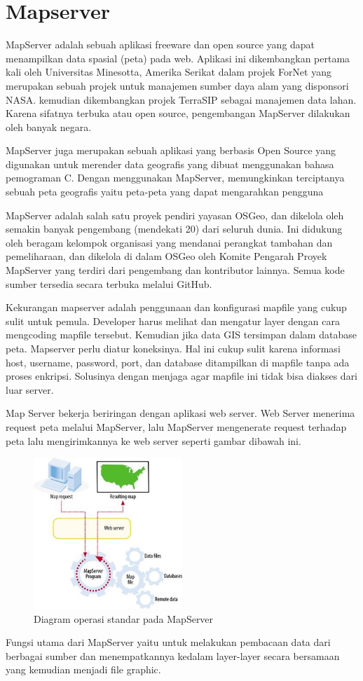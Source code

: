 \section{Mapserver}
MapServer adalah sebuah aplikasi freeware dan open source yang dapat menampilkan data spasial (peta) pada web. Aplikasi ini dikembangkan pertama kali oleh Universitas Minesotta, Amerika Serikat dalam projek ForNet yang merupakan sebuah projek untuk manajemen sumber daya alam yang disponsori NASA. kemudian dikembangkan projek TerraSIP sebagai manajemen data lahan. Karena sifatnya terbuka atau open source, pengembangan MapServer dilakukan oleh banyak negara.

 MapServer juga merupakan sebuah aplikasi yang berbasis Open Source yang digunakan untuk merender data geografis yang dibuat menggunakan bahasa pemograman C. Dengan menggunakan MapServer, memungkinkan terciptanya sebuah peta geografis yaitu peta-peta yang dapat mengarahkan pengguna

MapServer adalah salah satu proyek pendiri yayasan OSGeo, dan dikelola oleh semakin banyak pengembang (mendekati 20) dari seluruh dunia. Ini didukung oleh beragam kelompok organisasi yang mendanai perangkat tambahan dan pemeliharaan, dan dikelola di dalam OSGeo oleh Komite Pengarah Proyek MapServer yang terdiri dari pengembang dan kontributor lainnya. Semua kode sumber tersedia secara terbuka melalui GitHub.

Kekurangan mapserver adalah penggunaan dan konfigurasi mapfile yang cukup sulit untuk pemula. Developer harus melihat dan mengatur layer dengan cara mengcoding mapfile tersebut. Kemudian jika data GIS tersimpan dalam database peta. Mapserver perlu diatur koneksinya. Hal ini cukup sulit karena informasi host, username, password, port, dan database ditampilkan di mapfile tanpa ada proses enkripsi. Solusinya dengan menjaga agar mapfile ini tidak bisa diakses dari luar server.

Map Server bekerja beriringan dengan aplikasi web server. Web Server menerima request peta melalui MapServer, lalu MapServer mengenerate request terhadap peta lalu mengirimkannya ke web server seperti gambar dibawah ini.
\begin{figure}[ht]
	    \centerline{\includegraphics[width=0.50\textwidth]{figures/gambar5.JPG}}
	    \caption{Diagram operasi standar pada MapServer}
		\label{gambar5}
		\end{figure}
Fungsi utama dari MapServer yaitu untuk melakukan pembacaan data dari berbagai sumber dan menempatkannya kedalam layer-layer secara bersamaan yang kemudian menjadi file graphic.

